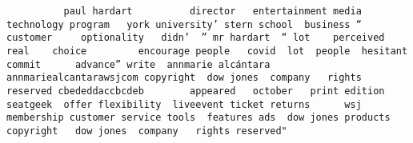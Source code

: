 \documentclass[
]{article}
\begin{document}
\begin{verbatim}
          paul hardart          director   entertainment media  technology program   york university’ stern school  business “  customer     optionality   didn’  ” mr hardart  “ lot    perceived     real    choice         encourage people   covid  lot  people  hesitant  commit      advance” write  annmarie alcántara  annmariealcantarawsjcom copyright  dow jones  company   rights reserved cbededdaccbcdeb        appeared   october   print edition  seatgeek  offer flexibility  liveevent ticket returns      wsj membership customer service tools  features ads  dow jones products copyright   dow jones  company   rights reserved"                                                                                                                                                                                                                                                                                                                                                                                                                                                                                                                                                                                                                                                                                                                                                                                                                                                                                                                                                                                                                                                                                                                                                                                                                                                                                                                                                                                                                                                                                                                                                                                                                                                                                                                                                                                                                                                                                                                                                                                                                                                                                                                                                                                                                                                                                                                                                                                                                                                                                                                                                                                                                                                                                                                                                                                                 
\end{verbatim}
\end{document}

